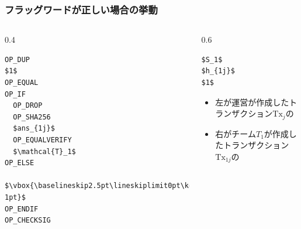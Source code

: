 \begin{frame}[fragile]
  \frametitle{フラッグワードが正しい場合の挙動}

  \pause
  \begin{columns}
    \begin{column}{0.4\textwidth}
      \begin{minipage}[c][0.9\textheight][c]{\linewidth}
\begin{lstlisting}[style=bitcoin-script, caption={$\text{Tx}_j$の\ScriptPubKey}]
OP_DUP
$1$
OP_EQUAL
OP_IF
  OP_DROP
  OP_SHA256
  $ans_{1j}$
  OP_EQUALVERIFY
  $\mathcal{T}_1$
OP_ELSE
  $\vbox{\baselineskip2.5pt\lineskiplimit0pt\kern1pt\hbox{.}\hbox{.}\hbox{.}\kern-1pt}$
OP_ENDIF
OP_CHECKSIG 
\end{lstlisting}
      \end{minipage}
    \end{column}
    \begin{column}{0.6\textwidth}
      \begin{center}
         \begin{minipage}[c]{0.6666666\linewidth}
\begin{lstlisting}[style=bitcoin-script, caption={$\text{Tx}_{1j}$の\ScriptSig}]
$S_1$
$h_{1j}$
$1$
\end{lstlisting}
         \end{minipage}
       \end{center}

       \pause
       \begin{itemize}
         \item<+-> 左が運営が作成したトランザクション$\text{Tx}_j$の\ScriptPubKey
         \item<+-> 右がチーム$T_1$が作成したトランザクション$\text{Tx}_{1j}$の\ScriptSig
       \end{itemize}
    \end{column}
  \end{columns}
\end{frame}

